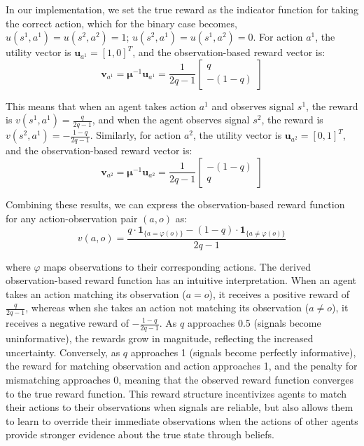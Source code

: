 In our implementation, we set the true reward as the indicator function for taking
the correct action, which for the binary case becomes, $u(s^{1}, a^{1}) = u(s^{2}
    , a^{2}) = 1$; $u(s^{2}, a^{1}) = u(s^{1}, a^{2}) = 0$. For action $a^{1}$, the
utility vector is $\bm{u}_{a^1}= [1, 0]^{T}$, and the observation-based reward vector
is:
\begin{equation}
    \bm{v}_{a^1}= \bm{\mu}^{-1}\bm{u}_{a^1}= \frac{1}{2q-1}
    \begin{bmatrix}
        q \\
        -(1-q)
    \end{bmatrix}
\end{equation}

This means that when an agent takes action $a^{1}$ and observes signal $s^{1}$,
the reward is $v(s^{1}, a^{1}) = \frac{q}{2q-1}$, and when the agent observes signal
$s^{2}$, the reward is $v(s^{2}, a^{1}) = -\frac{1-q}{2q-1}$. Similarly, for
action $a^{2}$, the utility vector is $\bm{u}_{a^2}= [0, 1]^{T}$, and the
observation-based reward vector is:
\begin{equation}
    \bm{v}_{a^2}= \bm{\mu}^{-1}\bm{u}_{a^2}= \frac{1}{2q-1}
    \begin{bmatrix}
        -(1-q) \\
        q
    \end{bmatrix}
\end{equation}

Combining these results, we can express the observation-based reward function for
any action-observation pair $(a, o)$ as:
\begin{equation}
    v(a, o) = \frac{q \cdot \mathbf{1}_{\{a = \varphi(o)\}}- (1-q) \cdot
        \mathbf{1}_{\{a \neq \varphi(o)\}}}{2q-1}
\end{equation}

where $\varphi$ maps observations to their corresponding actions. The derived
observation-based reward function has an intuitive interpretation. When an agent
takes an action matching its observation ($a = o$), it receives a positive
reward of $\frac{q}{2q-1}$, whereas when she takes an action not matching its observation
($a \neq o$), it receives a negative reward of $-\frac{1-q}{2q-1}$. As $q$ approaches
0.5 (signals become uninformative), the rewards grow in magnitude, reflecting the
increased uncertainty. Conversely, as $q$ approaches 1 (signals become perfectly
informative), the reward for matching observation and action approaches 1, and the
penalty for mismatching approaches 0, meaning that the observed reward function
converges to the true reward function. This reward structure incentivizes agents
to match their actions to their observations when signals are reliable, but also
allows them to learn to override their immediate observations when the actions
of other agents provide stronger evidence about the true state through beliefs.

